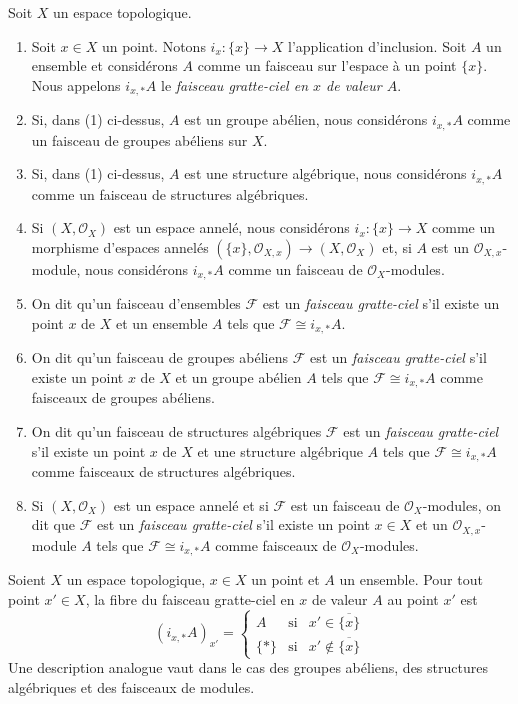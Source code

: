 \begin{definition}
\label{definition-skyscraper-sheaf}
Soit $X$ un espace topologique.
\begin{enumerate}
\item Soit $x \in X$ un point. Notons $i_x : \{x\} \to X$ l'application d'inclusion.
Soit $A$ un ensemble et considérons $A$ comme un faisceau sur l'espace à un point $\{x\}$.
Nous appelons $i_{x, *}A$ le {\it faisceau gratte-ciel en $x$ de valeur $A$}.
\item Si, dans (1) ci-dessus, $A$ est un groupe abélien, nous considérons
$i_{x, *}A$ comme un faisceau de groupes abéliens sur $X$.
\item Si, dans (1) ci-dessus, $A$ est une structure algébrique, nous considérons
$i_{x, *}A$ comme un faisceau de structures algébriques.
\item Si $(X, \mathcal{O}_X)$ est un espace annelé, nous considérons
$i_x : \{x\} \to X$ comme un morphisme d'espaces annelés
$(\{x\}, \mathcal{O}_{X, x}) \to (X, \mathcal{O}_X)$
et, si $A$ est un $\mathcal{O}_{X, x}$-module, nous considérons
$i_{x, *}A$ comme un faisceau de $\mathcal{O}_X$-modules.
\item On dit qu'un faisceau d'ensembles $\mathcal{F}$ est un {\it faisceau gratte-ciel}
s'il existe un point $x$ de $X$ et un ensemble $A$ tels
que $\mathcal{F} \cong i_{x, *}A$.
\item On dit qu'un faisceau de groupes abéliens $\mathcal{F}$ est un
{\it faisceau gratte-ciel} s'il existe un point $x$ de $X$
et un groupe abélien $A$ tels que $\mathcal{F} \cong i_{x, *}A$
comme faisceaux de groupes abéliens.
\item On dit qu'un faisceau de structures algébriques $\mathcal{F}$ est un
{\it faisceau gratte-ciel} s'il existe un point $x$ de $X$
et une structure algébrique $A$ tels que $\mathcal{F} \cong i_{x, *}A$
comme faisceaux de structures algébriques.
\item Si $(X, \mathcal{O}_X)$ est un espace annelé et
si $\mathcal{F}$ est un faisceau de $\mathcal{O}_X$-modules,
on dit que $\mathcal{F}$ est un {\it faisceau gratte-ciel} s'il
existe un point $x \in X$ et un $\mathcal{O}_{X, x}$-module
$A$ tels que $\mathcal{F} \cong i_{x, *}A$
comme faisceaux de $\mathcal{O}_X$-modules.
\end{enumerate}
\end{definition}

\begin{lemma}
\label{lemma-skyscraper-stalks}
Soient $X$ un espace topologique, $x \in X$ un point et
$A$ un ensemble. Pour tout point $x' \in X$, la fibre du
faisceau gratte-ciel en $x$ de valeur $A$ au point $x'$ est
$$
(i_{x, *}A)_{x'} =
\left\{
\begin{matrix}
A & \text{si} & x' \in \overline{\{x\}} \\
\{*\} & \text{si} & x' \not\in \overline{\{x\}}
\end{matrix}
\right.
$$
Une description analogue vaut dans le cas des
groupes abéliens, des structures algébriques et des
faisceaux de modules.
\end{lemma}

